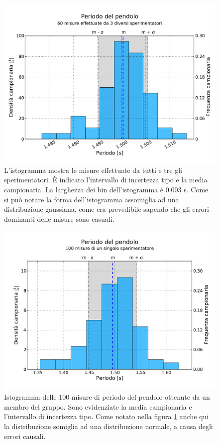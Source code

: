 \begin{figure}[p]
	\centering
	\includegraphics[width=120mm]{grafici/Pendolo.pdf}
	\caption{L'istogramma mostra le misure effettuate da tutti e tre gli sperimentatori.
        È indicato l'intervallo di incertezza tipo e la media campionaria. La larghezza
        dei bin dell'istogramma è 0.003 s. Come si può notare la forma dell'istogramma
        assomiglia ad una distribuzione gaussiana, come era prevedibile sapendo che gli
        errori dominanti delle misure sono casuali.}
    \label{fig:pendolo}
\end{figure}

\begin{figure}[p]
	\centering
	\includegraphics[width=120mm]{grafici/Pendolo100.pdf}
	\caption{Istogramma delle 100 misure di periodo del pendolo ottenute
        da un membro del gruppo. Sono evidenziate la media campionaria
        e l'intervallo di incertezza tipo. Come notato nella figura \ref{fig:pendolo}
        anche qui la distribuzione somiglia ad una distribuzione normale,
        a causa degli errori causali.}
    \label{fig:pendolo100}
\end{figure}

